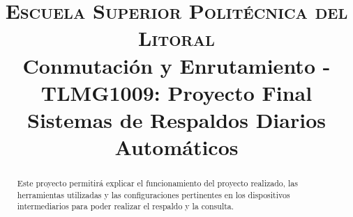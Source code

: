 \documentclass[conference]{IEEEtran}
\begin{document}
\title{
{\large \textsc{Escuela Superior Politécnica del Litoral}\\
Conmutación y Enrutamiento - TLMG1009: Proyecto Final
}\\
Sistemas de Respaldos Diarios Automáticos\\
}

\author{
\and
{}
\and
{}
\and
{}
\and
{}
}


\maketitle

\begin{abstract}
	Este proyecto permitirá explicar el funcionamiento del proyecto realizado, las herramientas utilizadas y las configuraciones pertinentes en los dispositivos intermediarios para poder realizar el respaldo y la consulta.
\end{abstract}
\end{document}
